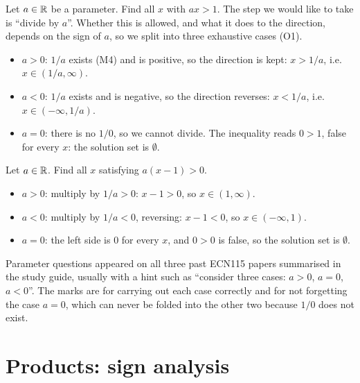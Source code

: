 \begin{example}[Solving $ax>1$][ex:ax-gt-1]
Let $a\in\mathbb{R}$ be a parameter. Find all $x$ with $ax>1$.
\solution
The step we would like to take is ``divide by $a$''. Whether this is allowed, and what it does to the
direction, depends on the sign of $a$, so we split into three exhaustive cases (O1).
\begin{itemize}
  \item $a>0$: $1/a$ exists (M4) and is positive, so the direction is kept: $x>1/a$, i.e.\ $x\in(1/a,\infty)$.
  \item $a<0$: $1/a$ exists and is negative, so the direction reverses: $x<1/a$, i.e.\ $x\in(-\infty,1/a)$.
  \item $a=0$: there is no $1/0$, so we cannot divide. The inequality reads $0>1$, false for every $x$: the
  solution set is $\emptyset$.
\end{itemize}
\end{example}

\begin{example}
Let $a\in\mathbb{R}$. Find all $x$ satisfying $a(x-1)>0$. 
\solution
\begin{itemize}
  \item $a>0$: multiply by $1/a>0$: $x-1>0$, so $x\in(1,\infty)$.
  \item $a<0$: multiply by $1/a<0$, reversing: $x-1<0$, so $x\in(-\infty,1)$.
  \item $a=0$: the left side is $0$ for every $x$, and $0>0$ is false, so the solution set is $\emptyset$.
\end{itemize}
\end{example}

\begin{examtip}
Parameter questions appeared on all three past ECN115 papers summarised in the study guide, usually with a
hint such as ``consider three cases: $a>0$, $a=0$, $a<0$''. The marks are for carrying out each case correctly
and for not forgetting the case $a=0$, which can never be folded into the other two because $1/0$ does not
exist.
\end{examtip}

\section{Products: sign analysis}\label{sec:sign-analysis}

